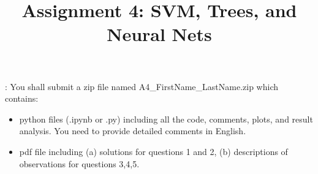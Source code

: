 \documentclass{exam}
\title{Assignment 4: SVM, Trees, and Neural Nets}
\date{}
\begin{document}
\maketitle
\thispagestyle{headandfoot}

\begin{center}
  {}
\end{center}
\vspace{.5cm}


\vspace{10pt}
: 
You shall submit a zip file named A4\_FirstName\_LastName.zip which contains:

\begin{itemize}
  \item python files (.ipynb or .py) including all the code, comments, plots, and result analysis. You need to provide detailed comments in English.
   \item pdf file including (a) solutions for questions 1 and 2, (b) descriptions of observations for questions 3,4,5. 
\end{itemize}
\end{document}
